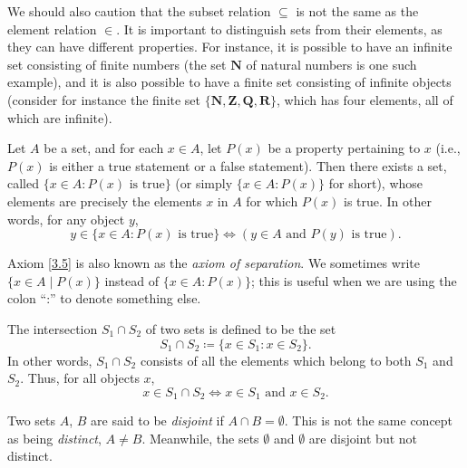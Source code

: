 \begin{remark}\label{3.1.21}
    We should also caution that the subset relation \(\subseteq\) is not the same as the element relation \(\in\).
    It is important to distinguish sets from their elements, as they can have different properties.
    For instance, it is possible to have an infinite set consisting of finite numbers (the set \(\mathbf{N}\) of natural numbers is one such example), and it is also possible to have a finite set consisting of infinite objects
    (consider for instance the finite set \(\{\mathbf{N}, \mathbf{Z}, \mathbf{Q}, \mathbf{R}\}\), which has four elements, all of which are infinite).
\end{remark}

\begin{axiom}\label{3.5}
    Let \(A\) be a set, and for each \(x \in A\), let \(P(x)\) be a property pertaining to \(x\) (i.e., \(P(x)\) is either a true statement or a false statement).
    Then there exists a set, called \(\{x \in A : P(x) \text{ is true}\}\) (or simply \(\{x \in A : P(x)\}\) for short), whose elements are precisely the elements \(x\) in \(A\) for which \(P(x)\) is true.
    In other words, for any object \(y\),
    \[
        y \in \{x \in A : P(x) \text{ is true}\} \iff (y \in A \text{ and } P(y) \text{ is true}).
    \]
\end{axiom}

\begin{note}
    Axiom \ref{3.5} is also known as the \emph{axiom of separation}.
    We sometimes write \(\{x \in A \mid P(x)\}\) instead of \(\{x \in A : P(x)\}\);
    this is useful when we are using the colon ``:'' to denote something else.
\end{note}

\setcounter{theorem}{22}
\begin{definition}[Intersections]\label{3.1.23}
    The intersection \(S_1 \cap S_2\) of two sets is defined to be the set
    \[
        S_1 \cap S_2 \coloneqq \{x \in S_1 : x \in S_2\}.
    \]
    In other words, \(S_1 \cap S_2\) consists of all the elements which belong to both \(S_1\) and \(S_2\).
    Thus, for all objects \(x\),
    \[
        x \in S_1 \cap S_2 \iff x \in S_1 \text{ and } x \in S_2.
    \]
\end{definition}

\begin{note}
    Two sets \(A\), \(B\) are said to be \emph{disjoint} if \(A \cap B = \emptyset\).
    This is not the same concept as being \emph{distinct}, \(A \neq B\).
    Meanwhile, the sets \(\emptyset\) and \(\emptyset\) are disjoint but not distinct.
\end{note}


